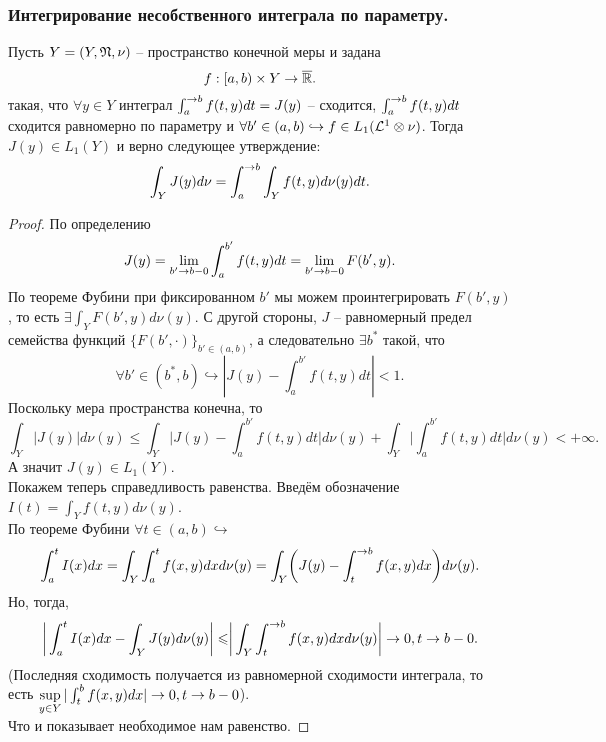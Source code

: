 \subsubsection{Интегрирование несобственного интеграла по параметру.}
\begin{theorem}
    Пусть $Y = (Y, \mathfrak{N}, \nu)$ -- пространство конечной меры и задана
    \[
        f: [a, b) \times Y \to \overline{\mathbb{R}}.
    \]
    такая, что $\forall y \in Y$ интеграл $\int_a^{\rightarrow b} f(t, y)dt = J(y)$ -- сходится, $\int_a^{\rightarrow b}f(t, y)dt$ сходится равномерно по параметру и $\forall b' \in (a, b) \hookrightarrow f \in L_1(\mathcal{L}^1 \otimes \nu)$.
    Тогда $J(y) \in L_1(Y)$ и верно следующее утверждение:
    \[
        \int_Y J(y)d\nu = \int_a^{\rightarrow b} \int_Y f(t, y)d\nu(y)dt.
    \]
\end{theorem}
\begin{proof}
    По определению
    \[
        J(y) = \lim\limits_{b' \rightarrow b - 0} \int_a^{b'}f(t, y)dt = \lim\limits_{b' \rightarrow b - 0} F(b', y).
    \]
    По теореме Фубини при фиксированном $b'$ мы можем проинтегрировать $F(b', y)$, то есть $\exists \int_Y F(b', y)d\nu(y)$.
    С другой стороны, $J$ -- равномерный предел семейства функций $\{F(b', \cdot)\}_{b' \in (a, b)}$, а следовательно $\exists b^*$ такой, что
    \[
        \forall b' \in (b^*, b) \hookrightarrow |J(y) - \int_a^{b'} f(t, y)dt| < 1.
    \]
    Поскольку мера пространства конечна, то
    \[
        \int_Y |J(y)|d\nu(y) \leq \int_Y \biggr|J(y) - \int_a^{b'}f(t, y)dt\biggr|d\nu(y) + \int_Y\biggr|\int_a^{b'}f(t, y)dt\biggr|d\nu(y) < +\infty.
    \]
    А значит $J(y) \in L_1(Y)$. \\ %
    Покажем теперь справедливость равенства.
    Введём обозначение $I(t) = \int_Y f(t, y)d\nu(y)$. \\
    По теореме Фубини $\forall t \in (a, b) \hookrightarrow$
    \[
        \int_a^t I(x)dx = \int_Y \int_a^t f(x, y)dxd\nu(y) = \int_Y \biggr(J(y) - \int_t^{\rightarrow b}f(x, y)dx \biggr) d\nu(y).
    \]
    Но, тогда,
    \[
        \biggr| \int_a^t I(x)dx - \int_Y J(y)d\nu(y) \biggr| \leqslant \biggr|\int_Y \int_t^{\rightarrow b} f(x, y)dx d\nu(y) \biggr| \rightarrow 0, t \rightarrow b - 0.
    \]
    (Последняя сходимость получается из равномерной сходимости интеграла, то есть $\sup\limits_{y \in Y} |\int_t^b f(x, y)dx| \rightarrow 0, t \rightarrow b - 0$). \\
    Что и показывает необходимое нам равенство.
\end{proof}
